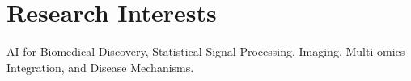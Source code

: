 \section{Research Interests}
\begin{sectioncontent}
AI for Biomedical Discovery, Statistical Signal Processing, Imaging, Multi-omics Integration, and Disease Mechanisms.%
\end{sectioncontent}